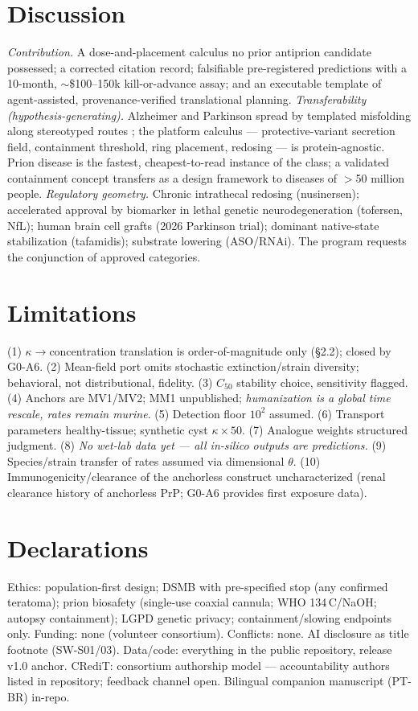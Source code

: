 \documentclass[10pt,twocolumn]{article}
\begin{document}
\section{Discussion}
\emph{Contribution.} A dose-and-placement calculus no prior antiprion candidate possessed; a corrected citation record; falsifiable pre-registered predictions with a 10-month, $\sim$\$100--150k kill-or-advance assay; and an executable template of agent-assisted, provenance-verified translational planning.
\emph{Transferability (hypothesis-generating).} Alzheimer and Parkinson spread by templated misfolding along stereotyped routes \citep{stopschinski2017,jucker2018}; the platform calculus --- protective-variant secretion field, containment threshold, ring placement, redosing --- is protein-agnostic. Prion disease is the fastest, cheapest-to-read instance of the class; a validated containment concept transfers as a design framework to diseases of $>$50 million people.
\emph{Regulatory geometry.} Chronic intrathecal redosing (nusinersen); accelerated approval by biomarker in lethal genetic neurodegeneration (tofersen, NfL); human brain cell grafts (2026 Parkinson trial); dominant native-state stabilization (tafamidis); substrate lowering (ASO/RNAi). The program requests the conjunction of approved categories.

\section{Limitations}
(1) $\kappa\to$concentration translation is order-of-magnitude only (\S2.2); closed by G0-A6. (2) Mean-field port omits stochastic extinction/strain diversity; behavioral, not distributional, fidelity. (3) $C_{50}$ stability choice, sensitivity flagged. (4) Anchors are MV1/MV2; MM1 unpublished; \emph{humanization is a global time rescale, rates remain murine}. (5) Detection floor $10^2$ assumed. (6) Transport parameters healthy-tissue; synthetic cyst $\kappa\times50$. (7) Analogue weights structured judgment. (8) \emph{No wet-lab data yet --- all in-silico outputs are predictions.} (9) Species/strain transfer of rates assumed via dimensional $\theta$. (10) Immunogenicity/clearance of the anchorless construct uncharacterized (renal clearance history of anchorless PrP; G0-A6 provides first exposure data).

\section{Declarations}
Ethics: population-first design; DSMB with pre-specified stop (any confirmed teratoma); prion biosafety (single-use coaxial cannula; WHO 134\,\textdegree C/NaOH; autopsy containment); LGPD genetic privacy; containment/slowing endpoints only. Funding: none (volunteer consortium). Conflicts: none. AI disclosure as title footnote (SW-S01/03). Data/code: everything in the public repository, release v1.0 anchor. CRediT: consortium authorship model --- accountability authors listed in repository; feedback channel open. Bilingual companion manuscript (PT-BR) in-repo.
\end{document}
